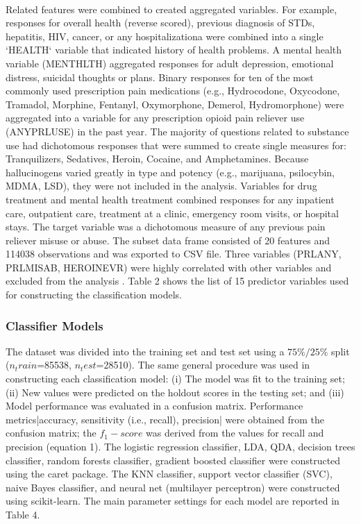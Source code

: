 \\\documentclass[sigconf]{acmart}
\begin{document}
Related features were combined to created aggregated variables. For example, 
responses for overall health (reverse scored), previous diagnosis of STDs, 
hepatitis, HIV, cancer, or any hospitalizationa were combined into a single 
`HEALTH` variable that indicated history of health problems. A mental health 
variable (MENTHLTH) aggregated responses for adult depression, emotional 
distress, suicidal thoughts or plans. Binary responses for ten of the most 
commonly used prescription pain medications (e.g., Hydrocodone, Oxycodone, 
Tramadol, Morphine, Fentanyl, Oxymorphone, Demerol, Hydromorphone) were
aggregated into a variable for any prescription opioid pain reliever use 
(ANYPRLUSE) in the past year. The majority of questions related to substance 
use had dichotomous responses that were summed to create single measures for: 
Tranquilizers, Sedatives, Heroin, Cocaine, and Amphetamines. Because 
hallucinogens varied greatly in type and potency (e.g., marijuana, psilocybin, 
MDMA, LSD), they were not included in the analysis. Variables for drug 
treatment and mental health treatment combined responses for any inpatient 
care, outpatient care, treatment at a clinic, emergency room visits, or 
hospital stays. The target variable was a dichotomous measure of any previous 
pain reliever misuse or abuse. The subset data frame consisted of 20 features 
and 114038 observations and was exported to CSV file. Three variables (PRLANY, 
PRLMISAB, HEROINEVR) were highly correlated with other variables and excluded 
from the analysis . Table 2 shows the list of 15 predictor variables used for 
constructing the classification models. 



\subsubsection{Classifier Models}

The dataset was divided into the training set and test set using a $75\%/25\%$  
split ($n_train$=85538, $n_test$=28510). The same general procedure was used in 
constructing each classification model: (i) The model was fit to the training 
set; (ii) New values were predicted on the holdout scores in the testing set; 
and (iii) Model performance was evaluated in a confusion matrix. Performance 
metrics|accuracy, sensitivity (i.e., recall), precision| were obtained from 
the confusion matrix; the $f_1-score$ was derived from the values for recall 
and precision (equation 1). The logistic regression classifier, LDA, QDA, 
decision trees classifier, random forests classifier, gradient boosted 
classifier were constructed using the caret package. The KNN classifier, 
support vector classifier (SVC), naive Bayes classifier, and neural net 
(multilayer perceptron) were constructed using scikit-learn. The main 
parameter settings for each model are reported in Table 4. 
\end{document}
